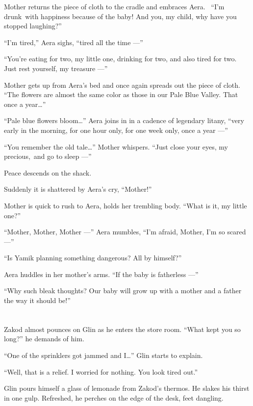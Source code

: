 \documentclass[twoside,11pt]{book}
\begin{document}
Mother returns the piece of cloth to the cradle and embraces Aera. ~``I'm drunk~with happiness because of
the baby! And you, my child, why have you stopped laughing?''

``I'm tired,'' Aera sighs, ``tired all the time ---''

``You're eating for two, my little one, drinking for two, and also tired for two. Just rest yourself, my
treasure ---''

Mother gets up from Aera's bed and once again spreads out the piece of cloth. ``The flowers are almost the
same color as those in our Pale Blue Valley. That once a year{\ldots}''

``Pale blue flowers bloom{\ldots}'' Aera joins in in a cadence of legendary litany,
``very early in the morning, for one hour only, for one week only, once a year ---''

``You remember the old tale{\ldots}'' Mother whispers. ``Just close your eyes, my
precious,~and go to sleep ---''

Peace descends on the shack.

Suddenly it is shattered by Aera's cry, ``Mother!''

Mother is quick to rush to Aera, holds her trembling body. ``What is it, my little one?''

``Mother, Mother, Mother ---'' Aera mumbles, ``I'm afraid, Mother, I'm so scared
---''

``Is Yamik planning something dangerous? All by himself?''

Aera huddles in her mother's arms. ``If the baby is fatherless ---''

``Why such bleak thoughts? Our baby will grow up with a mother and a father the way it should
be!''


\bigskip

\chapter{}

Zakod almost pounces on Glin as he enters the store room. ``What kept you so long?'' he
demands of him.

``One of the sprinklers got jammed and I{\ldots}'' Glin starts to explain.

``Well, that is a relief. I worried for nothing. You look tired out.''

Glin pours himself a glass of lemonade from Zakod's thermos. He{ }slakes his
thirst in one gulp. Refreshed, he perches on the edge of the desk, feet dangling.
\end{document}
